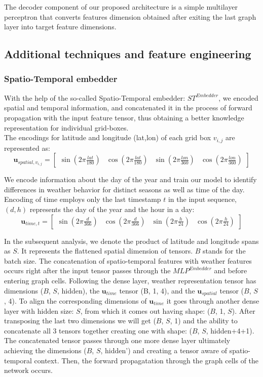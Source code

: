 The decoder component of our proposed architecture is a simple multilayer perceptron that converts features dimension obtained after exiting the last graph layer into target feature dimensions.

\subsection{Additional techniques and feature engineering}\label{chap:feat_eng}

\subsubsection{Spatio-Temporal embedder} \label{stembedder}
With the help of the so-called Spatio-Temporal embedder: $ST^{Embedder}$, we encoded spatial and temporal information, and concatenated it in the process of forward propagation with the input feature tensor, thus obtaining a better knowledge representation for individual grid-boxes. \\

The encodings for latitude and longitude (lat,lon) of each grid box $v_{i,j}$ are represented as:
\[
\mathbf{u}_{spatial, v_{i,j}} =
\begin{bmatrix}
    \sin{(2\pi\frac{lat}{180})} &
    \cos{(2\pi\frac{lat}{180})} &
    \sin{(2\pi\frac{lon}{360})} &
    \cos{(2\pi\frac{lon}{360})}
\end{bmatrix}
\]

We encode information about the day of the year and train our model to identify differences in weather behavior for distinct seasons as well as time of the day. Encoding of time employs only the last timestamp $t$ in the input sequence, $(d, h)$ represents the day of the year and the hour in a day: 
\[
\mathbf{u}_{time,t} =
\begin{bmatrix}
    \sin{(2\pi\frac{d}{366})} &
    \cos{(2\pi\frac{d}{366})} &
    \sin{(2\pi\frac{h}{24})} &
    \cos{(2\pi\frac{h}{24})}
\end{bmatrix}
\]

In the subsequent analysis, we denote the product of latitude and longitude spans as $S$. It represents the flattened spatial dimension of tensors. $B$ stands for the batch size. The concatenation of spatio-temporal features with weather features occurs right after the input tensor passes through the $MLP^{Embedder}$ and before entering graph cells. Following the dense layer, weather representation tensor has dimensions ($B$, $S$, hidden), the $\mathbf{u}_{time}$ tensor (B, 1, 4), and the $\mathbf{u}_{spatial}$ tensor ($B$, $S$, 4). To align the corresponding dimensions of $\mathbf{u}_{time}$ it goes through another dense layer with hidden size: $S$, from which it comes out having shape: ($B$, 1, $S$). After transposing the last two dimensions we will get ($B$, $S$, 1) and the ability to concatenate all 3 tensors together creating one with shape: ($B$, $S$, hidden+4+1). The concatenated tensor passes through one more dense layer ultimately achieving the dimensions ($B$, $S$, hidden') and creating a tensor aware of spatio-temporal context. Then, the forward propagatation through the graph cells of the network occurs.


